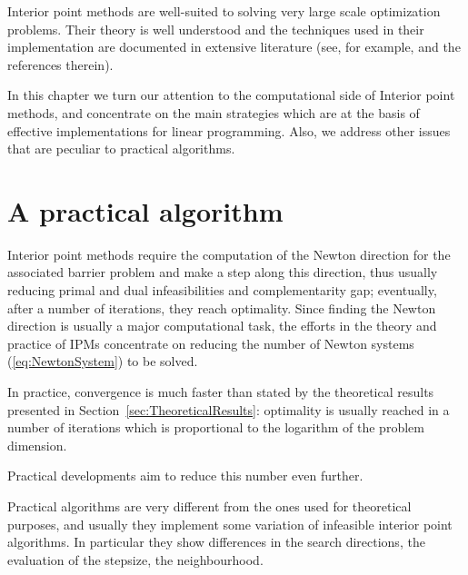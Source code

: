 
%
%
\label{ch:PracticalIpm}

Interior point methods are well-suited to solving very
large scale optimization problems. Their theory is well understood
\cite{ipm:Wright97} and the techniques used in their implementation are
documented in extensive literature (see, for example, 
\cite{AndersenGondzioMeszarosXu,GondzioTerlaky} and the references therein).

In this chapter we turn our attention to the computational side of
Interior point methods, and concentrate on the main strategies which are
at the basis of effective implementations for linear programming. Also,
we address other issues that are peculiar to practical algorithms.


%
%
\section{A practical algorithm}

Interior point methods require the computation of the Newton 
direction for the associated barrier problem and make a step along 
this direction, thus usually reducing primal and dual infeasibilities 
and complementarity gap; eventually, after a number of iterations, 
they reach optimality. 
Since finding the Newton direction is usually a major computational task, 
the efforts in the theory and practice of IPMs concentrate on reducing 
the number of Newton systems (\ref{eq:NewtonSystem}) to be solved.

In practice, convergence is much faster than stated by the theoretical
results presented in Section~\ref{sec:TheoreticalResults}: 
optimality is usually reached in a number of iterations which is 
proportional to the logarithm of the problem dimension. 


Practical developments aim to reduce this number even further. 

\hrulefill

Practical algorithms are very different from the ones used for
theoretical purposes, and usually they implement some variation
of infeasible interior point algorithms. In particular they show
differences in the search directions, the evaluation of the stepsize, 
the neighbourhood. 

